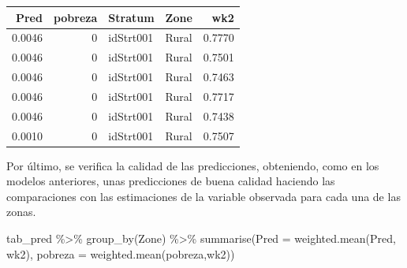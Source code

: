 \documentclass[
  12pt,
]{book}
\newenvironment{Shaded}{\begin{snugshade}}{\end{snugshade}}
\newcommand{\AttributeTok}[1]{\textcolor[rgb]{0.77,0.63,0.00}{#1}}
\newcommand{\DecValTok}[1]{\textcolor[rgb]{0.00,0.00,0.81}{#1}}
\newcommand{\FunctionTok}[1]{\textcolor[rgb]{0.00,0.00,0.00}{#1}}
\newcommand{\NormalTok}[1]{#1}
\newcommand{\OtherTok}[1]{\textcolor[rgb]{0.56,0.35,0.01}{#1}}
\newcommand{\SpecialCharTok}[1]{\textcolor[rgb]{0.00,0.00,0.00}{#1}}
\newcommand{\StringTok}[1]{\textcolor[rgb]{0.31,0.60,0.02}{#1}}
\begin{document}
\begin{Shaded}
\end{Shaded}

\begin{tabular}{r|r|l|l|r}
\hline
Pred & pobreza & Stratum & Zone & wk2\\
\hline
0.0046 & 0 & idStrt001 & Rural & 0.7770\\
\hline
0.0046 & 0 & idStrt001 & Rural & 0.7501\\
\hline
0.0046 & 0 & idStrt001 & Rural & 0.7463\\
\hline
0.0046 & 0 & idStrt001 & Rural & 0.7717\\
\hline
0.0046 & 0 & idStrt001 & Rural & 0.7438\\
\hline
0.0010 & 0 & idStrt001 & Rural & 0.7507\\
\hline
\end{tabular}

Por último, se verifica la calidad de las predicciones, obteniendo, como en los modelos anteriores, unas predicciones de buena calidad haciendo las comparaciones con las estimaciones de la variable observada para cada una de las zonas.

\begin{Shaded}
\begin{Highlighting}[]
\NormalTok{tab\_pred }\SpecialCharTok{\%\textgreater{}\%} \FunctionTok{group\_by}\NormalTok{(Zone) }\SpecialCharTok{\%\textgreater{}\%} 
  \FunctionTok{summarise}\NormalTok{(}\AttributeTok{Pred =} \FunctionTok{weighted.mean}\NormalTok{(Pred, wk2), }
            \AttributeTok{pobreza =} \FunctionTok{weighted.mean}\NormalTok{(pobreza,wk2))}
\end{Highlighting}
\end{Shaded}
\end{document}
